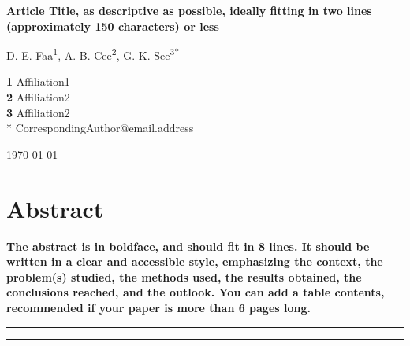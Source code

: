 \documentclass[submission, Phys]{SciPost}
\begin{document}
\begin{center}{\Large \textbf{
Article Title, as descriptive as possible, ideally fitting in two lines (approximately 150 characters) or less
}}\end{center}

\begin{center}
D. E. Faa\textsuperscript{1},
A. B. Cee\textsuperscript{2},
G. K. See\textsuperscript{3*}
\end{center}

\begin{center}
{\bf 1} Affiliation1
\\
{\bf 2} Affiliation2
\\
{\bf 3} Affiliation2
\\
* CorrespondingAuthor@email.address
\end{center}

\begin{center}
\today
\end{center}


\section*{Abstract}
{\bf
The abstract is in boldface, and should fit in 8 lines.
It should be written in a clear and accessible style, emphasizing the context, the problem(s) studied, the methods used, the results obtained, the conclusions reached, and the outlook. You can add a table contents, recommended if your paper is more than 6 pages long.
}


\vspace{10pt}
\noindent\rule{\textwidth}{1pt}
\tableofcontents\thispagestyle{fancy}
\noindent\rule{\textwidth}{1pt}
\vspace{10pt}
\end{document}
